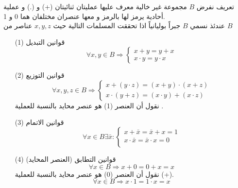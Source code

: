 \begin{frame}
	\begin{exampleblock}{تعريف}
		نفرض $B$ مجموعة غير خالية معرف عليها عمليتان ثنائيتان (+) و (.) و عملية أحادية يرمز لها بالرمز 
		\en{( $\bar{}$ )} و معها عنصران مختلفان هما 0 و 1.\\
		عندئذ نسمي $B$ جبراً بوليانياً اذا تحققت المسلمات التالية حيث $x,y,z$ عناصر من $B$
\begin{enumerate}
	\item[(1)] قوانين التبديل
	\[
	\forall x, y \in B \Rightarrow \begin{cases}
		x + y = y + x\\
		x\cdot y = y \cdot x
	\end{cases}
	\]
	\item[(2)] قوانين التوزيع
	\[
	\forall x,y,z \in B \Rightarrow \begin{cases}
		x + (y\cdot z) = (x+y)\cdot(x+z) \\
		x \cdot(y+z) = (x\cdot y) + (x\cdot z)
	\end{cases}
	\]
	نقول أن العنصر (1) هو عنصر محايد بالنسبة للعملية \en{($\cdot$)}.
		\end{enumerate}
			\end{exampleblock}
		\end{frame}
	\begin{frame}

\begin{exampleblock}{}
		\begin{enumerate}
	\item[(3)] قوانين الاتمام 
	\[
	\forall x \in B \exists \bar{x}: \begin{cases}
		x + \bar{x} = \bar{x} + x = 1\\
		x \cdot\bar{x} = \bar{x} \cdot x = 0\\
	\end{cases}
	\]
		\item[(4)] قوانين التطابق (العنصر المحايد)
	\[
	\forall x \in B \Rightarrow x + 0 = 0 + x = x
	\]
	نقول أن العنصر (0) هو عنصر محايد بالنسبة للعملية (+).
	\[
	\forall x \in B \Rightarrow x \cdot 1= 1\cdot  x = x
	\]
\end{enumerate}
\end{exampleblock}
\end{frame}


